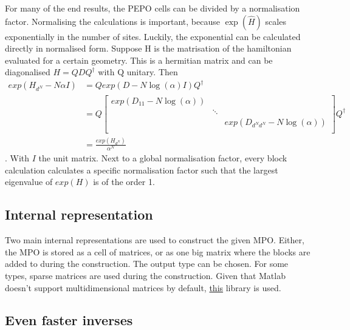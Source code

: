 For many of the end results, the PEPO cells can be divided by a normalisation factor. Normalising the calculations is important, because $\exp( \hat{H})$ scales exponentially in the number of sites. Luckily, the exponential can be calculated directly in normalised form. Suppose H is the matrisation of the hamiltonian evaluated for a certain geometry. This is a hermitian matrix and can be diagonalised $H= Q D Q^{\dagger}$ with Q unitary. Then
\begin{align}
    exp(  H_{d^N} - N \alpha I  ) & =  Q exp(  D- N \log(\alpha ) I    ) Q^{\dagger} \\
                                  & =  Q \begin{bmatrix} exp(D_{1 1} - N \log(\alpha )) &        &                                     \\
                                               & \ddots &                                     \\
                                               &        & exp(D_{ d^N d^N} - N \log(\alpha )) \\
    \end{bmatrix}  Q^{\dagger}      \\
                                  & = \frac{  exp(  H_{d^N} ) }{ \alpha^N }
\end{align}.
With $I$ the unit matrix. Next to a global normalisation factor, every block calculation calculates a specific normalisation factor such that the largest eigenvalue of $exp(H)$ is of the order 1.

\subsection{Internal representation}

Two main internal representations are used to construct the given MPO. Either, the MPO is stored as a cell of matrices, or as one big matrix where the blocks are added to during the construction. The output type can be chosen. For some types, sparse matrices are used during the construction. Given that Matlab doesn't support multidimensional matrices by default, \href{https://nl.mathworks.com/matlabcentral/fileexchange/29832-n-dimensional-sparse-arrays}{this} library is used. 

\subsection{Even faster inverses}

